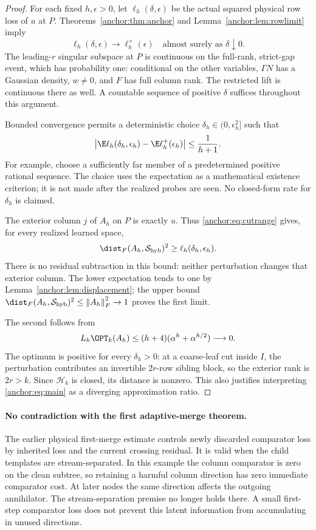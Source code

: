 \documentclass[11pt,oneside,openany,a4paper]{book}
\numberwithin{equation}{chapter}
\theoremstyle{definition}
\theoremstyle{remark}
\newcommand{\F}[1]{\left\lVert#1\right\rVert_F}
\newcommand{\HH}{\mathcal H}\newcommand{\SSS}{\mathcal S}
\begin{document}
\begin{proof}
For each fixed $h,\epsilon>0$, let $\ell_h(\delta,\epsilon)$ be the actual squared physical row loss of $u$ at $P$. Theorems~\ref{anchor:thm:anchor} and Lemma~\ref{anchor:lem:rowlimit} imply
\[
 \ell_h(\delta,\epsilon)\longrightarrow\ell_h^+(\epsilon)
 \quad\text{almost surely as }\delta\downarrow0.
\]
The leading-$r$ singular subspace at $P$ is continuous on the full-rank, strict-gap event, which has probability one: conditional on the other variables, $\Gamma N$ has a Gaussian density, $w\ne0$, and $F$ has full column rank. The restricted lift is continuous there as well. A countable sequence of positive $\delta$ suffices throughout this argument.

Bounded convergence permits a deterministic choice $\delta_h\in(0,\epsilon_h^2]$ such that
\[
 \left|\E\ell_h(\delta_h,\epsilon_h)-\E\ell_h^+(\epsilon_h)\right|
 \le\frac1{h+1}.
\]
For example, choose a sufficiently far member of a predetermined positive rational sequence. The choice uses the expectation as a mathematical existence criterion; it is not made after the realized probes are seen. No closed-form rate for $\delta_h$ is claimed.

The exterior column $j$ of $A_h$ on $P$ is exactly $u$. Thus \eqref{anchor:eq:cutrange} gives, for every realized learned space,
\begin{equation}\label{anchor:eq:rowlower}
 \dist_F(A_h,\SSS_{\rm hyb})^2\ge\ell_h(\delta_h,\epsilon_h).
\end{equation}
There is no residual subtraction in this bound: neither perturbation changes that exterior column. The lower expectation tends to one by Lemma~\ref{anchor:lem:displacement}; the upper bound $\dist_F(A_h,\SSS_{\rm hyb})^2\le\F{A_h}^2\to1$ proves the first limit.

The second follows from
\[
 L_h\OPT_k(A_h)\le(h+4)(\alpha^h+\alpha^{h/2})\longrightarrow0.
\]
The optimum is positive for every $\delta_h>0$: at a coarse-leaf cut inside $I$, the perturbation contributes an invertible $2r$-row sibling block, so the exterior rank is $2r>k$. Since $\HH_k$ is closed, its distance is nonzero. This also justifies interpreting \eqref{anchor:eq:main} as a diverging approximation ratio.
\end{proof}

\paragraph{No contradiction with the first adaptive-merge theorem.}
The earlier physical first-merge estimate controls newly discarded comparator loss by inherited loss and the current crossing residual. It is valid when the child templates are stream-separated. In this example the column comparator is zero on the clean subtree, so retaining a harmful column direction has zero immediate comparator cost. At later nodes the same direction affects the outgoing annihilator. The stream-separation premise no longer holds there. A small first-step comparator loss does not prevent this latent information from accumulating in unused directions.
\end{document}
